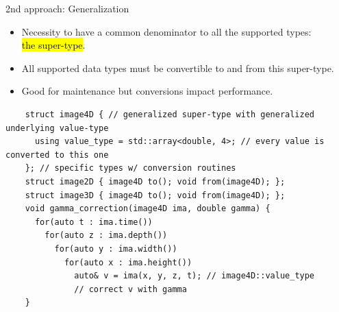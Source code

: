 \documentclass[12pt,aspectratio=169]{beamer}
\makeatletter
\let\HL\hl
\renewcommand\hl{%
  \let\set@color\beamerorig@set@color
  \let\reset@color\beamerorig@reset@color
  \HL}
\makeatother
\begin{document}
\begin{frame}[fragile]{2nd approach: Generalization}
  \begin{itemize}
    \item Necessity to have a common denominator to all the supported types:\\
          \hl{the super-type}.
    \item All supported data types must be convertible to and from this super-type.
    \item Good for maintenance but conversions impact performance.
  \end{itemize}
  \begin{verbatim}
    struct image4D { // generalized super-type with generalized underlying value-type
      using value_type = std::array<double, 4>; // every value is converted to this one
    }; // specific types w/ conversion routines
    struct image2D { image4D to(); void from(image4D); };
    struct image3D { image4D to(); void from(image4D); };
    void gamma_correction(image4D ima, double gamma) {
      for(auto t : ima.time())
        for(auto z : ima.depth())
          for(auto y : ima.width())
            for(auto x : ima.height())
              auto& v = ima(x, y, z, t); // image4D::value_type
              // correct v with gamma
    }
  \end{verbatim}
  \pdfcomment[icon=Note]{   }
  \pdfcomment[icon=Note]{   }
\end{frame}
\end{document}
